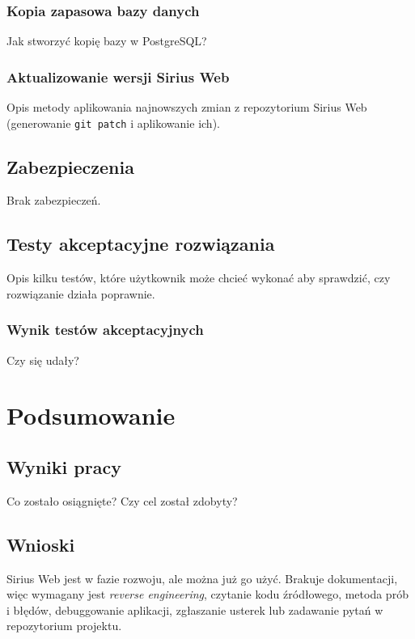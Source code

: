 \subsection{Kopia zapasowa bazy danych}

Jak stworzyć kopię bazy w PostgreSQL\@?

\subsection{Aktualizowanie wersji Sirius Web}

Opis metody aplikowania najnowszych zmian z repozytorium Sirius Web
(generowanie \texttt{git patch} i aplikowanie ich).

\section{Zabezpieczenia}

Brak zabezpieczeń.

\section{Testy akceptacyjne rozwiązania}

Opis kilku testów, które użytkownik może chcieć wykonać aby sprawdzić, czy
rozwiązanie działa poprawnie.

\subsection{Wynik testów akceptacyjnych}

Czy się udały?

\chapter{Podsumowanie}

\section{Wyniki pracy}

Co zostało osiągnięte? Czy cel został zdobyty?

\section{Wnioski}

Sirius Web jest w fazie rozwoju, ale można już go użyć. Brakuje dokumentacji,
więc wymagany jest \textit{reverse engineering}, czytanie kodu źródłowego,
metoda prób i błędów, debuggowanie aplikacji, zgłaszanie usterek lub zadawanie
pytań w repozytorium projektu.

